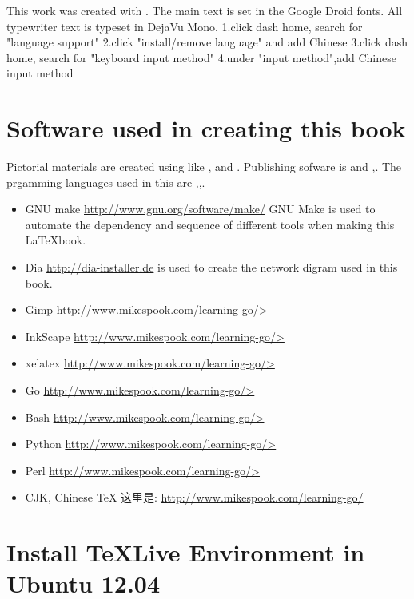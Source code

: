 \noindent{}This work was created with \XeLaTeX. The main text is set in
the Google Droid fonts. All typewriter text is typeset in DejaVu Mono.
1.click dash home, search for "language support"
2.click "install/remove language" and add Chinese
3.click dash home, search for "keyboard input method"
4.under "input method",add Chinese input method  

\section{Software used in creating this book}
\noindent{}Pictorial materials are created using  like ,  and . Publishing sofware is and ,. The prgamming languages used in this are ,,. 

\begin{itemize}
\item{GNU make \qquad\url{http://www.gnu.org/software/make/}}
GNU Make is used to automate the dependency and sequence of  different tools when making this \LaTeX  book.
\item{Dia  \qquad\url{http://dia-installer.de}}  is used to create the network digram used in this book.
\item{Gimp \qquad\url{http://www.mikespook.com/learning-go/>}}
\item{InkScape \qquad\url{http://www.mikespook.com/learning-go/>}}
\item{xelatex  \qquad\url{http://www.mikespook.com/learning-go/>}}
\item{Go  \qquad\url{http://www.mikespook.com/learning-go/>}}
\item{Bash  \qquad\url{http://www.mikespook.com/learning-go/>}}
\item{Python  \qquad\url{http://www.mikespook.com/learning-go/>}}
\item{Perl  \qquad\url{http://www.mikespook.com/learning-go/>}}
\item{CJK, Chinese TeX 这里是: {\url{http://www.mikespook.com/learning-go/}}
}
\end{itemize}

\section{Install \TeX Live Environment in Ubuntu 12.04}

